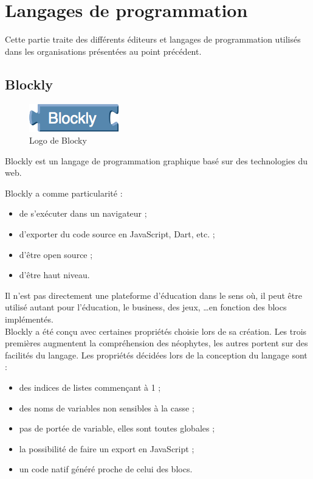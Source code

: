 \section{Langages de programmation}
\label{langages}
Cette partie traite des différents éditeurs et langages de programmation utilisés dans les organisations présentées au point précédent.

\subsection{Blockly}
\label{blockly}

\begin{figure}[!ht]
  \begin{center}
    \includegraphics[scale=0.5]{content/5-related_work/images/blocky}
    \caption{Logo de Blocky}
    \label{fig:blocky}
  \end{center}
\end{figure}
Blockly \cite{blockly} est un langage de programmation graphique basé sur des technologies du web. 

Blockly a comme particularité :
\begin{itemize}
\item de s'exécuter dans un navigateur ;
\item d'exporter du code source en JavaScript, Dart, etc. ;
\item d'être open source ;
\item d'être haut niveau.
\end{itemize}

Il n'est pas directement une plateforme d'éducation dans le sens où, il peut être utilisé autant pour l'éducation, le business, des jeux, \ldots en fonction des blocs implémentés.\\

Blockly a été conçu avec certaines propriétés choisie lors de sa création. Les trois premières augmentent la compréhension des néophytes, les autres portent sur des facilités du langage. Les propriétés décidées lors de la conception du langage sont \cite{blockly-lang} :

\begin{itemize}
  \item des indices de listes commençant à 1 ;
  \item des noms de variables non sensibles à la casse ;
  \item pas de portée de variable, elles sont toutes globales ;
  \item la possibilité de faire un export en JavaScript ;
  \item un code natif généré proche de celui des blocs.
\end{itemize}

